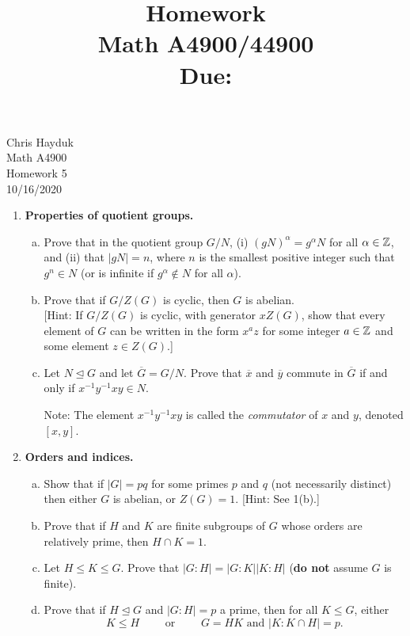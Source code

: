 \documentclass[11pt, reqno]{amsart}
\title[Homework \HW]{Homework \HW \\
Math A4900/44900\\
\small Due: \DUE}
\author{}
\theoremstyle{plain}
\theoremstyle{definition}
\theoremstyle{example}
\def\normeq{\unlhd}
\def\HW{5}
\def\DUE{10/16/2020}
\begin{document}
\begin{flushright}
Chris Hayduk\\
Math A4900\\
Homework \HW\\
\DUE
\end{flushright}





\begin{enumerate}[1.]
\item  {\bf Properties of quotient groups.}
\begin{enumerate}[(a)]
\item Prove that in the quotient group $G/N$, (i) $(gN)^\alpha = g^\alpha N$ for all $\alpha \in \mathbb{Z}$, and (ii) that $|gN| = n$, where $n$ is the smallest positive integer such that $g^n \in N$ (or is infinite if $g^\alpha \notin N$ for all $\alpha$).
\item Prove that if $G/Z(G)$ is cyclic, then $G$ is abelian. \\
	{\small [Hint: If $G/Z(G)$ is cyclic, with generator $x Z(G)$, show that every element of $G$ can be written in the form $x^a z$ for some integer $a \in \mathbb{Z}$ and some element $z \in Z(G)$.]}
\item Let $N \normeq G$ and let $\overline{G} = G/N$. Prove that $\overline{x}$ and $\overline{y}$ commute in $\overline{G}$ if and only if $x^{-1} y^{-1} xy \in N$. 

\smallskip

Note: The element $x^{-1} y^{-1} xy$ is called the \emph{commutator} of $x$ and $y$, denoted $[x,y]$.
\end{enumerate}

\item {\bf Orders and indices.} 

\begin{enumerate}[(a)]
\item Show that if $|G| = pq$ for some primes $p$ and $q$ (not necessarily distinct) then either $G$ is abelian, or $Z(G) = 1$. \hfill {\small[Hint: See 1(b).]}
\item Prove that if $H$ and $K$ are finite subgroups of $G$ whose orders are relatively prime, then $H \cap K = 1$. 
\item Let $H \leq K \leq G$. Prove that $|G:H| = |G:K||K:H|$ (\textbf{do not} assume $G$ is finite).
\item Prove that if $H \normeq G$ and $|G:H| = p$ a prime, then for all $K \leq G$, either 
$$K \leq H \qquad \text{ or } \qquad G = HK \text{ and } |K : K \cap H| = p.$$


\end{enumerate}
\end{enumerate}
\end{document}

